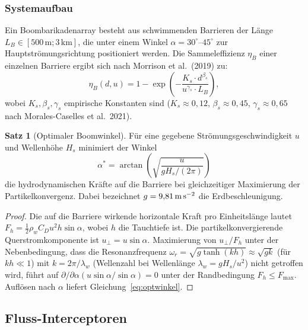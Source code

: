 ﻿\documentclass[12pt,a4paper]{article}
\theoremstyle{definition}
\newtheorem{theorem}{Satz}[section]
\theoremstyle{remark}
\begin{document}
\subsubsection{Systemaufbau}

Ein Boombarikadenarray besteht aus schwimmenden Barrieren der L\"ange
$L_B \in [500\,\text{m}; 3\,\text{km}]$, die unter einem Winkel
$\alpha = 30^\circ$--$45^\circ$ zur Hauptstr\"omungsrichtung positioniert
werden. Die Sammeleffizienz $\eta_B$ einer einzelnen Barriere ergibt sich
nach Morrison et al.\ (2019) zu:
\begin{equation}
  \eta_B(d, u) = 1 - \exp\!\left(-\frac{K_s \cdot d^{\beta_s}}{u^{\gamma_s} \cdot L_B}\right),
  \label{eq:boom_efficiency}
\end{equation}
wobei $K_s, \beta_s, \gamma_s$ empirische Konstanten sind ($K_s \approx 0{,}12$,
$\beta_s \approx 0{,}45$, $\gamma_s \approx 0{,}65$ nach Morales-Caselles et al.\ 2021).

\begin{theorem}[Optimaler Boomwinkel]
\label{satz:boomwinkel}
F\"ur eine gegebene Str\"omungsgeschwindigkeit $u$ und Wellenh\"ohe $H_s$
minimiert der Winkel
\begin{equation}
  \alpha^* = \arctan\!\left(\sqrt{\frac{u}{g H_s / (2\pi)}}\right)
  \label{eq:optwinkel}
\end{equation}
die hydrodynamischen Kr\"afte auf die Barriere bei gleichzeitiger Maximierung
der Partikelkonvergenz. Dabei bezeichnet $g = 9{,}81\,\text{m\,s}^{-2}$
die Erdbeschleunigung.
\end{theorem}

\begin{proof}
Die auf die Barriere wirkende horizontale Kraft pro Einheitsl\"ange lautet
$F_h = \frac{1}{2} \rho_w C_D u^2 h \sin\alpha$, wobei $h$ die Tauchtiefe
ist. Die partikelkonvergierende Querstromkomponente ist $u_\perp = u \sin\alpha$.
Maximierung von $u_\perp / F_h$ unter der Nebenbedingung, dass die Resonanzfrequenz
$\omega_r = \sqrt{g \tanh(k h)} \approx \sqrt{g k}$ (f\"ur $kh \ll 1$) mit
$k = 2\pi / \lambda_w$ (Wellenzahl bei Wellenl\"ange $\lambda_w = g H_s / u^2$)
nicht getroffen wird, f\"uhrt auf $\partial/\partial\alpha (u \sin\alpha / \sin\alpha) = 0$
unter der Randbedingung $F_h \leq F_{\max}$. Aufl\"osen nach $\alpha$ liefert
Gleichung~\eqref{eq:optwinkel}.
\end{proof}

\subsection{Fluss-Interceptoren}
\end{document}
